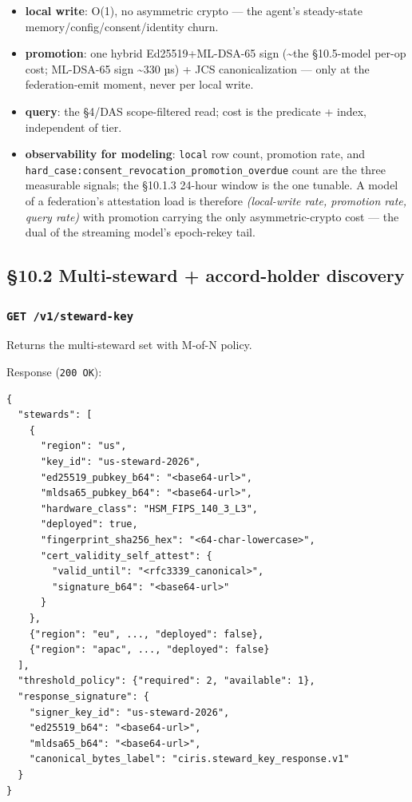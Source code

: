 \documentclass[10pt]{article}
\begin{document}
\begin{itemize}\setlength\itemsep{0pt}
\item \textbf{local write}: O(1), no asymmetric crypto — the agent's steady-state memory/config/consent/identity churn.
\item \textbf{promotion}: one hybrid Ed25519+ML-DSA-65 sign (\textasciitilde{}the §10.5-model per-op cost; ML-DSA-65 sign \textasciitilde{}330 µs) + JCS canonicalization — only at the federation-emit moment, never per local write.
\item \textbf{query}: the §4/DAS scope-filtered read; cost is the predicate + index, independent of tier.
\item \textbf{observability for modeling}: \texttt{local} row count, promotion rate, and \texttt{hard\_case:consent\_revocation\_promotion\_overdue} count are the three measurable signals; the §10.1.3 24-hour window is the one tunable. A model of a federation's attestation load is therefore \textit{(local-write rate, promotion rate, query rate)} with promotion carrying the only asymmetric-crypto cost — the dual of the streaming model's epoch-rekey tail.
\end{itemize}


\subsection*{§10.2 Multi-steward + accord-holder discovery}


\subsubsection*{\texttt{GET /v1/steward-key}}


Returns the multi-steward set with M-of-N policy.


Response (\texttt{200 OK}):


\begin{lstlisting}
{
  "stewards": [
    {
      "region": "us",
      "key_id": "us-steward-2026",
      "ed25519_pubkey_b64": "<base64-url>",
      "mldsa65_pubkey_b64": "<base64-url>",
      "hardware_class": "HSM_FIPS_140_3_L3",
      "deployed": true,
      "fingerprint_sha256_hex": "<64-char-lowercase>",
      "cert_validity_self_attest": {
        "valid_until": "<rfc3339_canonical>",
        "signature_b64": "<base64-url>"
      }
    },
    {"region": "eu", ..., "deployed": false},
    {"region": "apac", ..., "deployed": false}
  ],
  "threshold_policy": {"required": 2, "available": 1},
  "response_signature": {
    "signer_key_id": "us-steward-2026",
    "ed25519_b64": "<base64-url>",
    "mldsa65_b64": "<base64-url>",
    "canonical_bytes_label": "ciris.steward_key_response.v1"
  }
}
\end{lstlisting}
\end{document}

